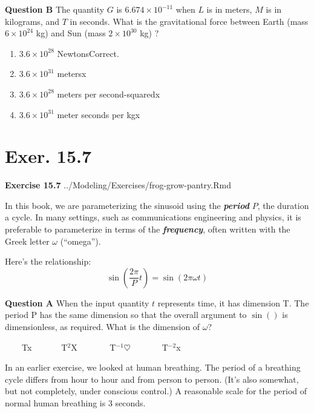 \documentclass[
  letterpaper,
  DIV=11,
  numbers=noendperiod,
  oneside]{article}
\providecommand{\tightlist}{%
  \setlength{\itemsep}{0pt}\setlength{\parskip}{0pt}}\usepackage{longtable,booktabs,array}
\begin{document}
\begin{multicols}{2}
\textbf{Question B} The quantity \(G\) is \(6.674 \times 10^{−11}\) when
\(L\) is in meters, \(M\) is in kilograms, and \(T\) in seconds. What is
the gravitational force between Earth (mass \(6 \times 10^{24}\) kg) and
Sun (mass \(2\times 10^{30}\) kg) ?

\begin{enumerate}
\def\labelenumi{\roman{enumi}.}
\tightlist
\item
  {\(3.6 \times 10^{28}\) Newtons{Correct.~}}\\
\item
  {\(3.6 \times 10^{31}\) meters{x}}\\
\item
  {\(3.6 \times 10^{28}\) meters per second-squared{x}}\\
\item
  {\(3.6 \times 10^{31}\) meter seconds per kg{x}}
\end{enumerate}

\hypertarget{exer.-15.7}{%
\section*{Exer. 15.7}\label{exer.-15.7}}

\textbf{Exercise 15.7} ../Modeling/Exercises/frog-grow-pantry.Rmd

In this book, we are parameterizing the sinusoid using the
\textbf{\emph{period}} \(P\), the duration a cycle. In many settings,
such as communications engineering and physics, it is preferable to
parameterize in terms of the \textbf{\emph{frequency}}, often written
with the Greek letter \(\omega\) (``omega'').

Here's the relationship:
\[\sin\left(\frac{2\pi}{P} t\right) = \sin(2\pi \omega t)\]

\textbf{Question A} When the input quantity \(t\) represents time, it
has dimension T. The period P has the same dimension so that the overall
argument to \(\sin()\) is dimensionless, as required. What is the
dimension of \(\omega\)?

~~~~{T{x}}~~~~~~~{T\(^2\){︎X
}}~~~~~~~{T\(^{-1}\){\(\heartsuit\ \)}}~~~~~~~{T\(^{-2}\){x}}

In an earlier exercise, we looked at human breathing. The period of a
breathing cycle differs from hour to hour and from person to person.
(It's also somewhat, but not completely, under conscious control.) A
reasonable scale for the period of normal human breathing is 3 seconds.


\end{multicols}
\end{document}
